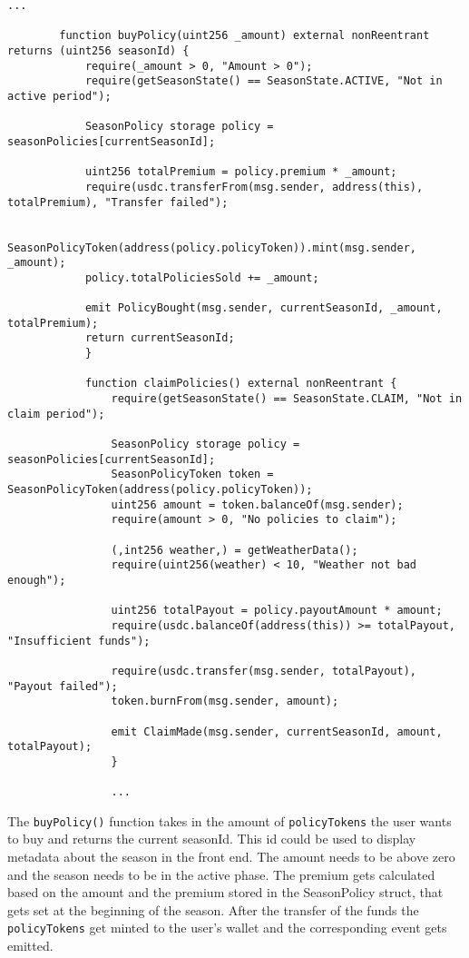 \documentclass[11pt,a4paper]{article}
\begin{document}
		\begin{lstlisting}[style=soliditystyle, caption={RainyDayFund.sol - Main Insurance Contract},label={lst:contract-claims}]
		...

		function buyPolicy(uint256 _amount) external nonReentrant returns (uint256 seasonId) {
			require(_amount > 0, "Amount > 0");
			require(getSeasonState() == SeasonState.ACTIVE, "Not in active period");

			SeasonPolicy storage policy = seasonPolicies[currentSeasonId];

			uint256 totalPremium = policy.premium * _amount;
			require(usdc.transferFrom(msg.sender, address(this), totalPremium), "Transfer failed");

			SeasonPolicyToken(address(policy.policyToken)).mint(msg.sender, _amount);
			policy.totalPoliciesSold += _amount;

			emit PolicyBought(msg.sender, currentSeasonId, _amount, totalPremium);
			return currentSeasonId;
			}

			function claimPolicies() external nonReentrant {
				require(getSeasonState() == SeasonState.CLAIM, "Not in claim period");

				SeasonPolicy storage policy = seasonPolicies[currentSeasonId];
				SeasonPolicyToken token = SeasonPolicyToken(address(policy.policyToken));
				uint256 amount = token.balanceOf(msg.sender);
				require(amount > 0, "No policies to claim");

				(,int256 weather,) = getWeatherData();
				require(uint256(weather) < 10, "Weather not bad enough");

				uint256 totalPayout = policy.payoutAmount * amount;
				require(usdc.balanceOf(address(this)) >= totalPayout, "Insufficient funds");

				require(usdc.transfer(msg.sender, totalPayout), "Payout failed");
				token.burnFrom(msg.sender, amount);

				emit ClaimMade(msg.sender, currentSeasonId, amount, totalPayout);
				}

				...
		\end{lstlisting}

		The \texttt{buyPolicy()} function takes in the amount of \texttt{policyTokens} the user wants to buy and returns the current seasonId.
		This id could be used to display metadata about the season in the front end.
		The amount needs to be above zero and the season needs to be in the active phase.
		The premium gets calculated based on the amount and the premium stored in the SeasonPolicy struct, that gets set at the beginning of the season.
		After the transfer of the funds the \texttt{policyTokens} get minted to the user's wallet and the corresponding event gets emitted.
\end{document}
